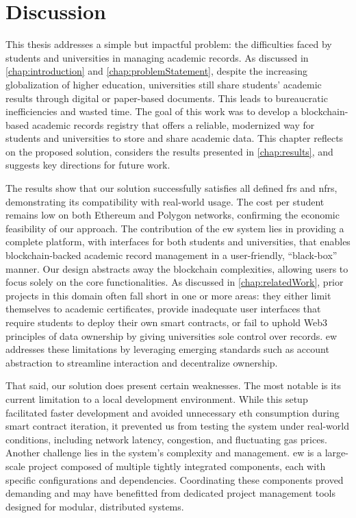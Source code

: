 \chapter{Discussion}
\label{chap:discussion}
This thesis addresses a simple but impactful problem: the difficulties faced by students and universities in managing academic records. As discussed in \cref{chap:introduction} and \cref{chap:problemStatement}, despite the increasing globalization of higher education, universities still share students' academic results through digital or paper-based documents. This leads to bureaucratic inefficiencies and wasted time.
The goal of this work was to develop a blockchain-based academic records registry that offers a reliable, modernized way for students and universities to store and share academic data. This chapter reflects on the proposed solution, considers the results presented in \cref{chap:results}, and suggests key directions for future work.

The results show that our solution successfully satisfies all defined \glspl{fr} and \glspl{nfr}, demonstrating its compatibility with real-world usage. The cost per student remains low on both Ethereum and Polygon networks, confirming the economic feasibility of our approach. The contribution of the \gls{ew} system lies in providing a complete platform, with interfaces for both students and universities, that enables blockchain-backed academic record management in a user-friendly, “black-box” manner. Our design abstracts away the blockchain complexities, allowing users to focus solely on the core functionalities.
As discussed in \cref{chap:relatedWork}, prior projects in this domain often fall short in one or more areas: they either limit themselves to academic certificates, provide inadequate user interfaces that require students to deploy their own smart contracts, or fail to uphold Web3 principles of data ownership by giving universities sole control over records. \gls{ew} addresses these limitations by leveraging emerging standards such as account abstraction to streamline interaction and decentralize ownership.

That said, our solution does present certain weaknesses. The most notable is its current limitation to a local development environment. While this setup facilitated faster development and avoided unnecessary \gls{eth} consumption during smart contract iteration, it prevented us from testing the system under real-world conditions, including network latency, congestion, and fluctuating gas prices. Another challenge lies in the system’s complexity and management. \gls{ew} is a large-scale project composed of multiple tightly integrated components, each with specific configurations and dependencies. Coordinating these components proved demanding and may have benefitted from dedicated project management tools designed for modular, distributed systems.

